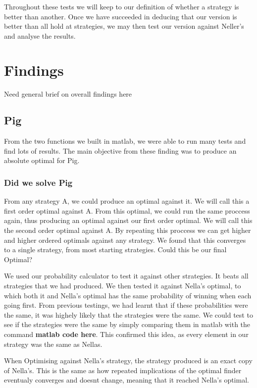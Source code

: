 \documentclass[a4paper,titlepage]{article}
\begin{document}
Throughout these tests we will keep to our definition of whether a strategy is better than another. Once we have succeeded in deducing that our version is better than all hold at strategies, we may then test our version against Neller’s and analyse the results.

\section{Findings}

Need general brief on overall findings here

\subsection{Pig}

From the two functions we built in matlab, we were able to run many tests and find lots of results. The main objective from these finding was to produce an absolute optimal for Pig.

\subsubsection{Did we solve Pig}

From any strategy A, we could produce an optimal against it. We will call this a first order optimal against A. From this optimal, we could run the same proccess again, thus producing an optimal against our first order optimal. We will call this the second order optimal against A. By repeating this proccess we can get higher and higher ordered optimals against any strategy. We found that this converges to a single strategy, from most starting strategies. Could this be our final Optimal?

We used our probability calculator to test it against other strategies. It beats all strategies that we had produced. We then tested it against Nella's optimal, to which both it and Nella's optimal has the same probability of winning when each going first. From previous testings, we had learnt that if these probabilities were the same, it was highely likely that the strategies were the same. We could test to see if the strategies were the same by simply comparing them in matlab with the command \textbf{matlab code here}. This confirmed this idea, as every element in our strategy was the same as Nellas.

When Optimising against Nella's strategy, the strategy produced is an exact copy of Nella's. This is the same as how repeated implications of the optimal finder eventualy converges and doesnt change, meaning that it reached Nella's optimal.
\end{document}
